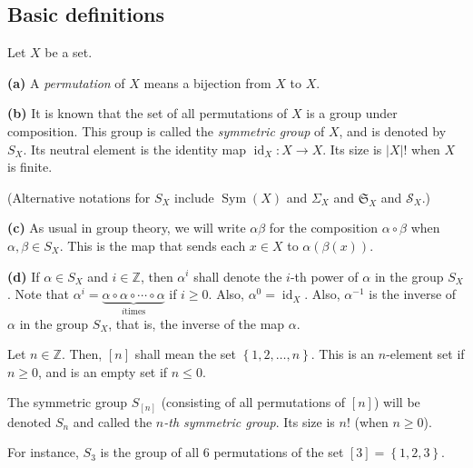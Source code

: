 \subsection{Basic definitions}

\begin{definition}
\label{def.perm.perm}Let $X$ be a set. \medskip

\textbf{(a)} A \emph{permutation} of $X$ means a bijection from $X$ to $X$.
\medskip

\textbf{(b)} It is known that the set of all permutations of $X$ is a group
under composition. This group is called the \emph{symmetric group} of $X$, and
is denoted by $S_{X}$. Its neutral element is the identity map
$\operatorname*{id}\nolimits_{X}:X\rightarrow X$. Its size is $\left\vert
X\right\vert !$ when $X$ is finite.

(Alternative notations for $S_{X}$ include $\operatorname*{Sym}\left(
X\right)  $ and $\Sigma_{X}$ and $\mathfrak{S}_{X}$ and $\mathcal{S}_{X}$.)
\medskip

\textbf{(c)} As usual in group theory, we will write $\alpha\beta$ for the
composition $\alpha\circ\beta$ when $\alpha,\beta\in S_{X}$. This is the map
that sends each $x\in X$ to $\alpha\left(  \beta\left(  x\right)  \right)  $.
\medskip

\textbf{(d)} If $\alpha\in S_{X}$ and $i\in\mathbb{Z}$, then $\alpha^{i}$
shall denote the $i$-th power of $\alpha$ in the group $S_{X}$. Note that
$\alpha^{i}=\underbrace{\alpha\circ\alpha\circ\cdots\circ\alpha}_{i\text{
times}}$ if $i\geq0$. Also, $\alpha^{0}=\operatorname*{id}\nolimits_{X}$.
Also, $\alpha^{-1}$ is the inverse of $\alpha$ in the group $S_{X}$, that is,
the inverse of the map $\alpha$.
\end{definition}

\begin{definition}
\label{def.perm.Sn-iven}Let $n\in\mathbb{Z}$. Then, $\left[  n\right]  $ shall
mean the set $\left\{  1,2,\ldots,n\right\}  $. This is an $n$-element set if
$n\geq0$, and is an empty set if $n\leq0$.

The symmetric group $S_{\left[  n\right]  }$ (consisting of all permutations
of $\left[  n\right]  $) will be denoted $S_{n}$ and called the $n$\emph{-th
symmetric group}. Its size is $n!$ (when $n\geq0$).
\end{definition}

For instance, $S_{3}$ is the group of all $6$ permutations of the set $\left[
3\right]  =\left\{  1,2,3\right\}  $.

